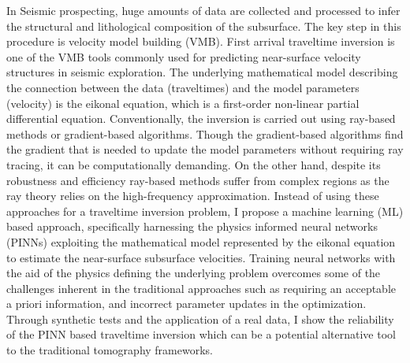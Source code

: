 In Seismic prospecting, huge amounts of data are collected and processed to infer the structural and lithological composition of the subsurface. The key step in this procedure is velocity model building (VMB). First arrival traveltime inversion is one of the VMB tools commonly used for predicting near-surface velocity structures in seismic exploration. The underlying mathematical model describing the connection between the data (traveltimes) and the model parameters (velocity) is the eikonal equation, which is a first-order non-linear partial differential equation. Conventionally, the inversion is carried out using ray-based methods or gradient-based algorithms. Though the gradient-based algorithms find the gradient that is needed to update the model parameters without requiring ray tracing, it can be computationally demanding. On the other hand, despite its robustness and efficiency ray-based methods suffer from complex regions as the ray theory relies on the high-frequency approximation. Instead of using these approaches for a traveltime inversion problem, I propose a machine learning (ML) based approach, specifically harnessing the physics informed neural networks (PINNs) exploiting the mathematical model represented by the eikonal equation to estimate the near-surface subsurface velocities. Training neural networks with the aid of the physics defining the underlying problem overcomes some of the challenges inherent in the traditional approaches such as requiring an acceptable a priori information, and incorrect parameter updates in the optimization. Through synthetic tests and the application of a real data, I show the reliability of the PINN based traveltime inversion which can be a potential alternative tool to the traditional tomography frameworks.

